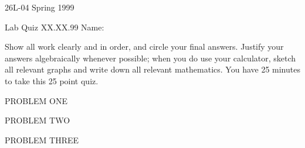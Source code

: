 \documentclass[11pt,epsfig]{article}
\begin{document}
26L-04 Spring 1999 

Lab Quiz XX.XX.99 \hspace{1.9in} {Name:} {\underline {\hspace{2.5in}}}
\vspace{2pc}

Show all work clearly and in order, and circle your final answers.  
Justify your answers algebraically whenever possible; when you do use 
your calculator, sketch all relevant graphs and write down all 
relevant mathematics.  You have 25 minutes to take this 25 point quiz.
\vspace{2pc}

\begin{problem}{5}
PROBLEM ONE
\vfill
\end{problem}

\begin{problem}{10}
PROBLEM TWO
\vfill
\end{problem}

\begin{problem}{10}
PROBLEM THREE
\vfill
\end{problem}

\showpoints
\end{document}
